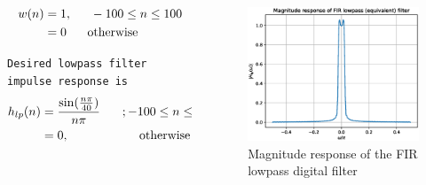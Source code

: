 \documentclass[notheorems]{beamer}
\begin{document}
\begin{frame}

\begin{columns}
\begin{column}[t]{0.4\textwidth}



\small

\begin{align*}
w(n) &= 1, \indent -100 \leq n \leq 100 \nonumber \\
		&= 0 \hspace{6mm} \mbox{otherwise}
\end{align*}

\texttt {Desired lowpass filter impulse response is }
\begin{align*}
h_{lp}(n) &= \frac{\sin(\frac{n\pi}{40})}{n\pi}  \indent \; ; -100 \leq n \leq 100 \nonumber \\
&= 0, \hspace{2cm} \mbox{otherwise}
\end{align*}

\end{column}

\begin{column}[t]{0.6\textwidth}
\begin{figure}
\label{fig6}
\includegraphics[width = 6.5cm]{figs/FIR_lowpass.eps}
\caption{Magnitude response of the FIR lowpass digital filter } 
\end{figure}
\end{column} 

\end{columns}

\end{frame}
\end{document}
